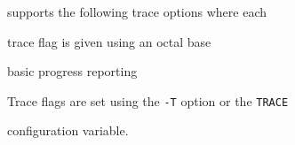  supports the following trace options where each


trace flag is given using an octal base


\begin{optlist}


  basic progress reporting




\end{optlist}


Trace flags are set using the \texttt{-T} option or the  \texttt{TRACE} 


configuration variable.

























